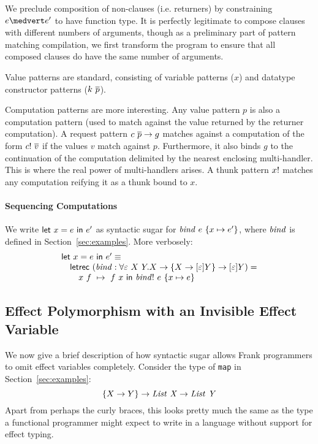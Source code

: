 We preclude composition of non-clauses (i.e. returners) by
constraining $e \medvert e'$ to have function type.
%
It is perfectly legitimate to compose clauses with different numbers
of arguments, though as a preliminary part of pattern matching
compilation, we first transform the program to ensure that all
composed clauses do have the same number of arguments.

Value patterns are standard, consisting of variable patterns ($x$) and
datatype constructor patterns ($k~\overline{p}$).

Computation patterns are more interesting. Any value pattern $p$ is
also a computation pattern (used to match against the value returned
by the returner computation).
%
A request pattern ${c~\overline{p}} \rightarrow {g}$ matches against a
computation of the form ${c}!~\overline{v}$ if the values $v$ match
against $p$. Furthermore, it also binds $g$ to the continuation of the
computation delimited by the nearest enclosing multi-handler. This is
where the real power of multi-handlers arises. A thunk pattern
${x}!$ matches any computation reifying it as a thunk bound to
$x$.


\paragraph{Sequencing Computations}
We write $\mathsf{let}~x=e~\mathsf{in}~e'$ as syntactic sugar for
$\mathit{bind}~e~\{{x \mapsto e'}\}$, where $\mathit{bind}$ is defined in
Section~\ref{sec:examples}. More verbosely:
%
\[
\bstack
\key{let}~x=e~\key{in}~e' \equiv \\
\quad \key{letrec}~
  (\var{bind} :
    \forall \varepsilon~X~Y.
       X \to \thunk{X \to \effbox{\varepsilon}Y} \to \effbox{\varepsilon}Y) = \\
  \qquad x~f~\mapsto~f~x~\key{in}~\force{\var{bind}}~e~\thunk{x \mapsto e}
\estack
\]

\subsection{Effect Polymorphism with an Invisible Effect Variable}

We now give a brief description of how syntactic sugar allows Frank
programmers to omit effect variables completely.
%
Consider the type of \verb!map! in Section~\ref{sec:examples}:
\[
\{{X \to Y}\} \to \mathit{List~X} \to \mathit{List~Y}
\]
Apart from perhaps the curly braces, this looks pretty much the same
as the type a functional programmer might expect to write in a
language without support for effect typing.

